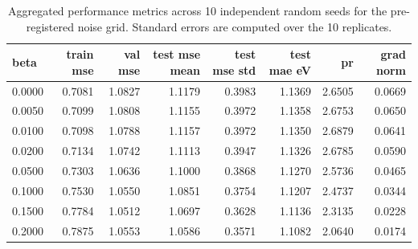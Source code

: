 \begin{table}[htbp]
\centering
\caption{Aggregated performance metrics across 10 independent random seeds for the pre-registered noise grid. Standard errors are computed over the 10 replicates.}
\label{tab:main_sweep_summary}
\begin{tabular}{lrrrrrrr}
\toprule
\textbf{beta} & \textbf{train mse} & \textbf{val mse} & \textbf{test mse mean} & \textbf{test mse std} & \textbf{test mae eV} & \textbf{pr} & \textbf{grad norm} \\
\midrule
0.0000 & 0.7081 & 1.0827 & 1.1179 & 0.3983 & 1.1369 & 2.6505 & 0.0669 \\
0.0050 & 0.7099 & 1.0808 & 1.1155 & 0.3972 & 1.1358 & 2.6753 & 0.0650 \\
0.0100 & 0.7098 & 1.0788 & 1.1157 & 0.3972 & 1.1350 & 2.6879 & 0.0641 \\
0.0200 & 0.7134 & 1.0742 & 1.1113 & 0.3947 & 1.1326 & 2.6785 & 0.0590 \\
0.0500 & 0.7303 & 1.0636 & 1.1000 & 0.3868 & 1.1270 & 2.5736 & 0.0465 \\
0.1000 & 0.7530 & 1.0550 & 1.0851 & 0.3754 & 1.1207 & 2.4737 & 0.0344 \\
0.1500 & 0.7784 & 1.0512 & 1.0697 & 0.3628 & 1.1136 & 2.3135 & 0.0228 \\
0.2000 & 0.7875 & 1.0553 & 1.0586 & 0.3571 & 1.1082 & 2.0640 & 0.0174 \\
\bottomrule
\end{tabular}
\end{table}